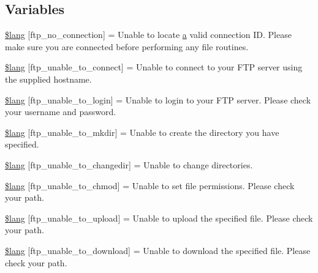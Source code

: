 \subsection*{Variables}
\begin{DoxyCompactItemize}
\item 
\hyperlink{ftp__lang_8php_a8630404f8e0c3750f8d997f35622b6eb}{\$lang} \mbox{[}\textquotesingle{}ftp\+\_\+no\+\_\+connection\textquotesingle{}\mbox{]} = \textquotesingle{}Unable to locate \hyperlink{bootstrap_8min_8js_a1f5870dcf487187f13d5fd328ed9e6e7}{a} valid connection I\+D. Please make sure you are connected before performing any file routines.\textquotesingle{}
\item 
\hyperlink{ftp__lang_8php_a57d51cf019dd2e380b84c6e31cda0cf5}{\$lang} \mbox{[}\textquotesingle{}ftp\+\_\+unable\+\_\+to\+\_\+connect\textquotesingle{}\mbox{]} = \textquotesingle{}Unable to connect to your F\+T\+P server using the supplied hostname.\textquotesingle{}
\item 
\hyperlink{ftp__lang_8php_affe13cbf898e1802abb3cd9d9ce2db97}{\$lang} \mbox{[}\textquotesingle{}ftp\+\_\+unable\+\_\+to\+\_\+login\textquotesingle{}\mbox{]} = \textquotesingle{}Unable to login to your F\+T\+P server. Please check your username and password.\textquotesingle{}
\item 
\hyperlink{ftp__lang_8php_acd954089043ea7ad47397376e2630d87}{\$lang} \mbox{[}\textquotesingle{}ftp\+\_\+unable\+\_\+to\+\_\+mkdir\textquotesingle{}\mbox{]} = \textquotesingle{}Unable to create the directory you have specified.\textquotesingle{}
\item 
\hyperlink{ftp__lang_8php_a2e8eab1a2d2d33cde249097df270b7df}{\$lang} \mbox{[}\textquotesingle{}ftp\+\_\+unable\+\_\+to\+\_\+changedir\textquotesingle{}\mbox{]} = \textquotesingle{}Unable to change directories.\textquotesingle{}
\item 
\hyperlink{ftp__lang_8php_a9ffd10144a0dfd5a3c7ab69e4edf1fdf}{\$lang} \mbox{[}\textquotesingle{}ftp\+\_\+unable\+\_\+to\+\_\+chmod\textquotesingle{}\mbox{]} = \textquotesingle{}Unable to set file permissions. Please check your path.\textquotesingle{}
\item 
\hyperlink{ftp__lang_8php_a1fd0c9f4e0f3be691a809ce804900ed7}{\$lang} \mbox{[}\textquotesingle{}ftp\+\_\+unable\+\_\+to\+\_\+upload\textquotesingle{}\mbox{]} = \textquotesingle{}Unable to upload the specified file. Please check your path.\textquotesingle{}
\item 
\hyperlink{ftp__lang_8php_a65fa9f8b6a3da91390b36721c2a9775b}{\$lang} \mbox{[}\textquotesingle{}ftp\+\_\+unable\+\_\+to\+\_\+download\textquotesingle{}\mbox{]} = \textquotesingle{}Unable to download the specified file. Please check your path.\textquotesingle{}

\end{DoxyCompactItemize}
